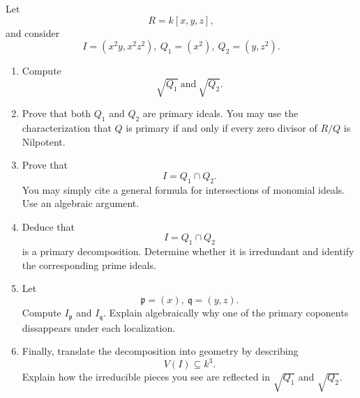 \documentclass[11pt]{article}
\begin{document}
\begin{prob}
    Let 
    \[
        R = k[x,y,z], 
    \]    
    and consider 
    \[
        I = (x^2y, x^2z^2), \ Q_1 = (x^2), \ Q_2 = (y,z^2). 
    \]

    \begin{enumerate}[label=(\alph*)]
        \item Compute 
            \[
                \sqrt{Q_1} \ \text{and} \ \sqrt{Q_2}. 
            \]
        \item Prove that both $Q_1$ and $Q_2$ are 
            primary ideals. 
            You may use the characterization 
            that $Q$ is primary if and only if 
            every zero divisor of $R/Q$ is Nilpotent. 
            
        \item Prove that 
            \[
                I = Q_1 \cap Q_2. 
            \]
            You may  simply 
            cite a general formula for intersections 
            of monomial ideals. Use an algebraic argument. 

        \item Deduce that 
            \[
                I = Q_1 \cap Q_2
            \]
            is a primary decomposition. 
            Determine whether it is irredundant 
            and identify the corresponding prime ideals. 
        \item Let 
            \[
                \mathfrak p = (x), \ \mathfrak q = (y,z).
            \]
            Compute $I_{\mathfrak p}$ and 
            $I_{\mathfrak q}$. 
            Explain algebraically why 
            one of the primary coponents 
            dissappears under each localization. 
        \item Finally, translate the decomposition 
            into geometry by describing 
            \[
                V(I) \subseteq k^3. 
            \]
            Explain how the irreducible 
            pieces you see are reflected 
            in $\sqrt{Q_1}$ and $\sqrt{Q_2}$. 
    \end{enumerate}
\end{prob}
\end{document}
